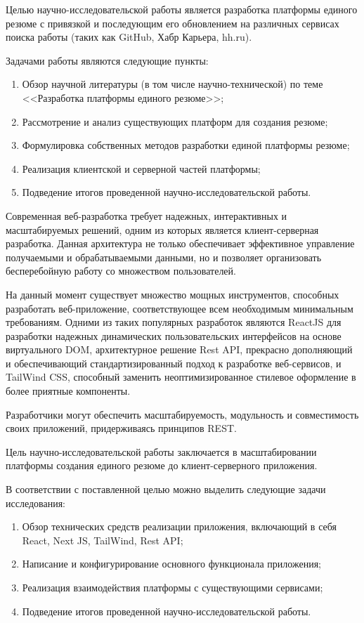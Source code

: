 \documentclass[master, och, diploma]{SCWorks}
\begin{document}
Целью научно-исследовательской работы является разработка платформы единого резюме с привязкой и последующим его обновлением на различных сервисах поиска работы (таких как GitHub, Хабр Карьера, hh.ru).

Задачами работы являются следующие пункты:
\begin{enumerate}
    \item Обзор научной литературы (в том числе научно-технической) по теме 
    <<Разработка платформы единого резюме>>;
    \item Рассмотрение и анализ существующих платформ для создания резюме;
    \item Формулировка собственных методов разработки единой платформы резюме;
    \item Реализация клиентской и серверной частей платформы;
    \item Подведение итогов проведенной научно-исследовательской работы.
\end{enumerate}


Современная веб-разработка требует надежных, интерактивных и масштабируемых решений, одним из которых является клиент-серверная разработка. Данная архитектура не только обеспечивает эффективное управление получаемыми и обрабатываемыми данными, но и позволяет организовать бесперебойную работу со множеством пользователей.

На данный момент существует множество мощных инструментов, способных разработать веб-приложение, соответствующее всем необходимым минимальным требованиям. Одними из таких популярных разработок являются ReactJS для разработки надежных динамических пользовательских интерфейсов на основе виртуального DOM, архитектурное решение Rest API, прекрасно дополняющий и обеспечивающий стандартизированный подход к разработке веб-сервисов, и TailWind CSS, способный заменить неоптимизированное стилевое оформление в более приятные компоненты.

Разработчики могут обеспечить масштабируемость, модульность и совместимость своих приложений, придерживаясь принципов REST. 

Цель научно-исследовательской работы заключается в масштабировании платформы создания единого резюме до клиент-серверного приложения.

В соответствии с поставленной целью можно выделить следующие задачи исследования: 
\begin{enumerate}
    \item Обзор технических средств реализации приложения, включающий в себя React, Next JS, TailWind, Rest API;
    \item Написание и конфигурирование основного функционала приложения;
    \item Реализация взаимодействия платформы с существующими сервисами;
    \item Подведение итогов проведенной научно-исследовательской работы.
\end{enumerate}
\end{document}
